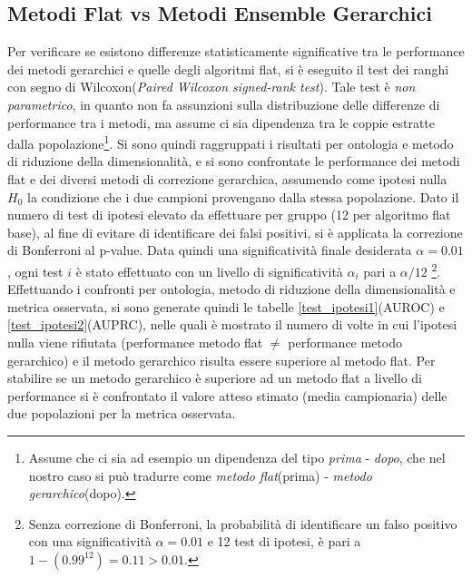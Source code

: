 \documentclass[12pt]{report}
\begin{document}
\subsection{Metodi Flat vs Metodi Ensemble Gerarchici}
Per verificare se esistono differenze statisticamente significative tra le performance dei metodi gerarchici e quelle degli algoritmi flat, si è eseguito il test dei ranghi con segno di Wilcoxon\cite{wilcoxon}(\emph{Paired Wilcoxon signed-rank test}). Tale test è \emph{non parametrico}, in quanto non fa assunzioni sulla distribuzione delle differenze di performance tra i metodi, ma assume ci sia dipendenza tra le coppie estratte dalla popolazione\footnote{\footnotesize{Assume che ci sia ad esempio un dipendenza del tipo \emph{prima} - \emph{dopo}, che nel nostro caso si può tradurre come \emph{metodo flat}(prima) -  \emph{metodo gerarchico}(dopo).}}.
\newline
\newline
Si sono quindi raggruppati i risultati per ontologia e metodo di riduzione della dimensionalità, e si sono confrontate le performance dei metodi flat e dei diversi metodi di correzione gerarchica, assumendo come ipotesi nulla $H_0$ la condizione che i due campioni provengano dalla stessa popolazione.
\newline
\newline 
Dato il numero di test di ipotesi elevato da effettuare per gruppo (12 per algoritmo flat base), al fine di evitare di identificare dei falsi positivi,  si è applicata la correzione di Bonferroni\cite{bonferr} al p-value. Data quindi una significatività finale desiderata $\alpha=0.01$, ogni test $i$ è stato effettuato con un livello di significatività $\alpha_i$ pari a $\alpha/12$ \footnote{\footnotesize{Senza correzione di Bonferroni, la probabilità di identificare un falso positivo con una significatività $\alpha = 0.01$ e 12 test di ipotesi, è pari a $1-(0.99^{12}) = 0.11 > 0.01$.}}.
\newline
\newline
Effettuando i confronti per ontologia, metodo di riduzione della dimensionalità e metrica osservata, si sono generate quindi le tabelle \ref{test_ipotesi1}(AUROC) e \ref{test_ipotesi2}(AUPRC), nelle quali è mostrato il numero di volte in cui l'ipotesi nulla viene rifiutata (performance metodo flat $\neq$ performance metodo gerarchico) e il metodo gerarchico risulta essere superiore al metodo flat. Per stabilire se un metodo gerarchico è superiore ad un metodo flat a livello di performance si è confrontato il valore atteso stimato (media campionaria) delle due popolazioni per la metrica osservata. 
\end{document}
